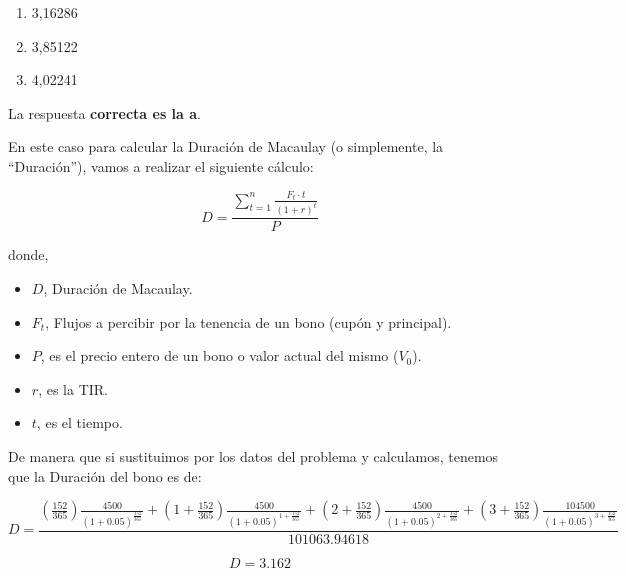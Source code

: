 \documentclass[
  letterpaper,
  DIV=11,
  numbers=noendperiod]{scrreprt}
\begin{document}
\begin{tcolorbox}
\begin{enumerate}
\def\labelenumi{\alph{enumi}.}
\item
  3,16286
\item
  3,85122
\item
  4,02241
\end{enumerate}

\begin{tcolorbox}[enhanced jigsaw, toprule=.15mm, left=2mm, breakable, opacitybacktitle=0.6, toptitle=1mm, coltitle=black, arc=.35mm, leftrule=.75mm, bottomtitle=1mm, titlerule=0mm, title=\textcolor{quarto-callout-tip-color}{\faLightbulb}\hspace{0.5em}{Solución}, rightrule=.15mm, opacityback=0, bottomrule=.15mm, colback=white, colframe=quarto-callout-tip-color-frame, colbacktitle=quarto-callout-tip-color!10!white]

La respuesta \textbf{correcta es la a}.

En este caso para calcular la Duración de Macaulay (o simplemente, la
``Duración''), vamos a realizar el siguiente cálculo:

\[D=\frac{\sum_{t=1}^{n}\frac{F_t\cdot t}{\left(1+r\right)^t}}{P}\]

donde,

\begin{itemize}
\item
  \(D\), Duración de Macaulay.
\item
  \(F_t\), Flujos a percibir por la tenencia de un bono (cupón y
  principal).
\item
  \(P\), es el precio entero de un bono o valor actual del mismo
  (\(V_0\)).
\item
  \(r\), es la TIR.
\item
  \(t\), es el tiempo.
\end{itemize}

De manera que si sustituimos por los datos del problema y calculamos,
tenemos que la Duración del bono es de:

\[D=\frac{\left(\frac{152}{365}\right)\frac{4500}{\left(1+0.05\right)^{\frac{152}{365}}}+\left(1+\frac{152}{365}\right)\frac{4500}{\left(1+0.05\right)^{1+\frac{152}{365}}}+\left(2+\frac{152}{365}\right)\frac{4500}{\left(1+0.05\right)^{2+\frac{152}{365}}}+\left(3+\frac{152}{365}\right)\frac{104500}{\left(1+0.05\right)^{3+\frac{152}{365}}}}{101063.94618}\]

\[D=3.162\]

\end{tcolorbox}


\end{tcolorbox}
\end{document}
